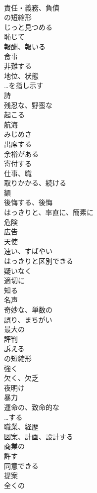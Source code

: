 \documentclass[8pt]{extreport}
\begin{document}
\begin{CJK}{UTF8}{min}
\\	責任・義務、負債
\\	の短縮形
\\	じっと見つめる
\\	恥じて
\\	報酬、報いる
\\	食事
\\	非難する
\\	地位、状態
\\	…を指し示す
\\	詩
\\	残忍な、野蛮な
\\	起こる
\\	航海
\\	みじめさ
\\	出席する
\\	余裕がある
\\	寄付する
\\	仕事、職
\\	取りかかる、続ける
\\	額
\\	後悔する、後悔
\\	はっきりと、率直に、簡素に
\\	危険
\\	広告
\\	天使
\\	速い、すばやい
\\	はっきりと区別できる
\\	疑いなく
\\	適切に
\\	知る
\\	名声
\\	奇妙な、単数の
\\	誤り、まちがい
\\	最大の
\\	評判
\\	訴える
\\	の短縮形
\\	強く
\\	欠く、欠乏
\\	夜明け
\\	暴力
\\	運命の、致命的な
\\	…する
\\	職業、経歴
\\	図案、計画、設計する
\\	商業の
\\	許す
\\	同意できる
\\	提案
\\	全くの

\end{CJK}
\end{document}
